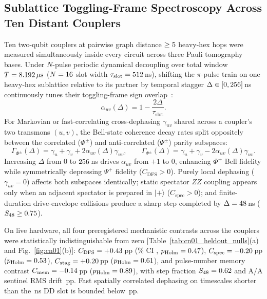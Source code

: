 \documentclass[twocolumn,aps,prapplied,superscriptaddress,floatfix]{revtex4-2}
\begin{document}
\subsection{Sublattice Toggling-Frame Spectroscopy Across Ten Distant Couplers}

Ten two-qubit couplers at pairwise graph distance $\ge5$ heavy-hex hops were measured simultaneously inside every circuit across three Pauli tomography bases. Under $N$-pulse periodic dynamical decoupling over total window $T = 8.192\,\mu\text{s}$ ($N=16$ slot width $\tau_{\mathrm{slot}} = 512$\,ns), shifting the $\pi$-pulse train on one heavy-hex sublattice relative to its partner by temporal stagger $\Delta \in [0, 256]$\,ns continuously tunes their toggling-frame sign overlap~\cite{pazsilva2017,tripathi2022}:
\begin{equation}
\alpha_{uv}(\Delta) = 1 - \frac{2\Delta}{\tau_{\mathrm{slot}}}.
\label{eq:toggling_overlap}
\end{equation}
For Markovian or fast-correlating cross-dephasing $\gamma_{uv}$ shared across a coupler's two transmons $(u, v)$, the Bell-state coherence decay rates split oppositely between the correlated ($\Phi^\pm$) and anti-correlated ($\Psi^\pm$) parity subspaces:
\begin{equation}
\Gamma_{\Phi^\pm}(\Delta) = \gamma_u + \gamma_v + 2\alpha_{uv}(\Delta)\gamma_{uv}, \qquad
\Gamma_{\Psi^\pm}(\Delta) = \gamma_u + \gamma_v - 2\alpha_{uv}(\Delta)\gamma_{uv}.
\label{eq:dfs_rates}
\end{equation}
Increasing $\Delta$ from $0$ to $256$\,ns drives $\alpha_{uv}$ from $+1$ to $0$, enhancing $\Phi^+$ Bell fidelity while symmetrically depressing $\Psi^+$ fidelity ($C_{\mathrm{DFS}} > 0$). Purely local dephasing ($\gamma_{uv}=0$) affects both subspaces identically; static spectator $ZZ$ coupling appears only when an adjacent spectator is prepared in $|{+}\rangle$ ($C_{\mathrm{spec}} > 0$); and finite-duration drive-envelope collisions produce a sharp step completed by $\Delta = 48$\,ns ($S_{48} \ge 0.75$).

On live hardware, all four preregistered mechanistic contrasts across the \CnTotalCouplers{} couplers were statistically indistinguishable from zero [Table~\ref{tab:cn01_heldout_nulls}(a) and Fig.~\ref{fig:cn01}(b)]: $C_{\mathrm{DFS}} = +0.43$\,pp (\CiLevelPct\% CI \CnCdfsCi, $p_{\mathrm{Holm}}=0.47$), $C_{\mathrm{spec}} = -0.20$\,pp ($p_{\mathrm{Holm}}=0.53$), $C_{\mathrm{stag}} = +0.20$\,pp ($p_{\mathrm{Holm}}=0.61$), and pulse-number memory contrast $C_{\mathrm{mem}} = -0.14$\,pp ($p_{\mathrm{Holm}}=0.89$), with step fraction $S_{48} = 0.62$ and A/A sentinel RMS drift \CnAaRmsRawPp\,pp. Fast spatially correlated dephasing on timescales shorter than the \CnSlotNs{}\,ns DD slot is bounded below \CnFastBoundPp\,pp.
\end{document}
